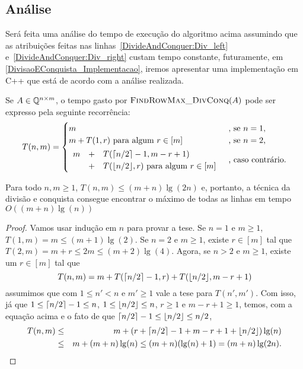 \subsection{Análise}
Será feita uma análise do tempo de execução do algoritmo acima assumindo que as atribuições feitas nas linhas~\ref{DivideAndConquer:Div_left} e~\ref{DivideAndConquer:Div_right} custam tempo constante, futuramente, em \ref{DivisaoEConquista_Implementacao}, iremos apresentar uma implementação em C++ que está de acordo com a análise realizada.  

Se $A \in \mathbb{Q}^{n \times m}$, o tempo gasto por $\textsc{FindRowMax\_DivConq}(A)$ pode ser expresso pela seguinte recorrência:
\begin{equation*}
T(n,m) =
\begin{cases}
    m                                           & \text{, se } n = 1 \text{,} \\
    m + T(1,r) \text{ para algum } r \in [m]    & \text{, se } n = 2 \text{,} \\[2pt]
    \begin{array}{lll}
        m & + & T(\lceil n/2\rceil-1,m-r+1) \\
          & + & T(\lfloor n/2\rfloor,r) \text{ para algum } r \in [m] 
    \end{array}                                 & \text{, caso contrário.}
\end{cases}
\end{equation*}

\begin{prop}
Para todo $n,m \geq 1$, $T(n,m) \leq (m+n)\lg(2n)$ e, portanto, a técnica da divisão e conquista consegue encontrar o máximo de todas as linhas em tempo $O((m+n)\lg(n))$
\end{prop}

\begin{proof}
Vamos usar indução em $n$ para provar a tese. Se $n = 1$ e $m \geq 1$, $T(1,m) = m \leq (m+1)\lg(2)$. Se $n = 2$ e $m \geq 1$, existe $r \in [m]$ tal que $T(2,m) = m + r \leq 2m \leq (m+2)\lg(4)$. Agora, se $n > 2$ e $m \geq 1$, existe um $r \in [m]$ tal que 
$$ T(n,m) = m + T(\lceil n/2\rceil - 1, r) + T(\lfloor n/2\rfloor, m - r + 1) $$
assumimos que com $1 \leq n' < n$ e $m' \geq 1$ vale a tese para $T(n',m')$. Com isso, já que $1 \leq \lceil n/2\rceil-1 \leq n$, $1 \leq \lfloor n/2\rfloor \leq n$, $r \geq 1$ e $m - r + 1 \geq 1$, temos, com a equação acima e o fato de que $\lceil n/2\rceil-1 \leq \lfloor n/2\rfloor \leq n/2$,
\begin{eqnarray*} 
    T(n,m) & \leq & m + (r + \lceil n/2\rceil - 1 + m - r + 1 + \lfloor n/2\rfloor)\lg(n) \\
           & \leq & m + (m + n)\lg(n) \leq (m + n)(\lg(n) + 1) = (m + n)\lg(2n).
\end{eqnarray*}
\end{proof}

